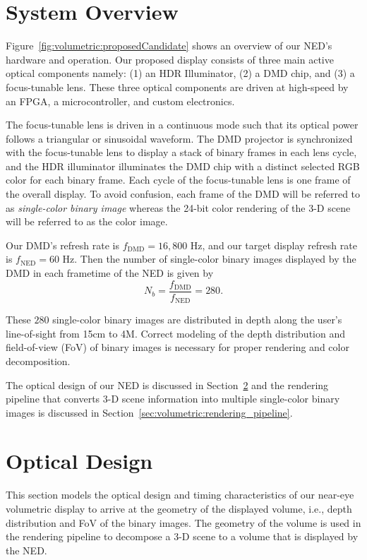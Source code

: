 \section{System Overview}
\label{sec:volumetric:system_overview}
Figure~\ref{fig:volumetric:proposedCandidate} shows an overview of our NED's hardware and operation. Our proposed display consists of three main active optical components namely: (1) an HDR Illuminator, (2) a DMD chip, and (3) a focus-tunable lens. These three optical components are driven at high-speed by an FPGA, a microcontroller, and custom electronics. 

The focus-tunable lens is driven in a continuous mode such that its optical power follows a triangular or sinusoidal waveform. The DMD projector is synchronized with the focus-tunable lens to display a stack of binary frames in each lens cycle, and the HDR illuminator illuminates the DMD chip with a distinct selected RGB color for each binary frame. Each cycle of the focus-tunable lens is one frame of the overall display. To avoid confusion, each frame of the DMD will be referred to as \emph{single-color binary image} whereas the 24-bit color rendering of the 3-D scene will be referred to as the color image.

Our DMD's refresh rate is $f_{\text{DMD}} = 16,800$ Hz, and our target display refresh rate is $f_{\text{NED}}=60$ Hz. Then the number of single-color binary images displayed by the DMD in each frametime of the NED is given by
\begin{equation}
N_b = \frac{f_{\text{DMD}}}{f_{\text{NED}}} = 280.
\label{eq:280}
\end{equation}

These $280$ single-color binary images are distributed in depth along the user's line-of-sight from 15cm to 4M.  Correct modeling of the depth distribution and field-of-view (FoV) of binary images is necessary for proper rendering and color decomposition. 

The optical design of our NED is discussed in Section~\ref{sec:volumetric:Optical_design} and the rendering pipeline that converts 3-D scene information into multiple single-color binary images is discussed in Section~\ref{sec:volumetric:rendering_pipeline}. 


\section{Optical Design}
\label{sec:volumetric:Optical_design}
This section models the optical design and timing characteristics of our near-eye volumetric display to arrive at the geometry of the displayed volume, i.e., depth distribution and FoV of the binary images. The geometry of the volume is used in the rendering pipeline to decompose a 3-D scene to a volume that is displayed by the NED.

